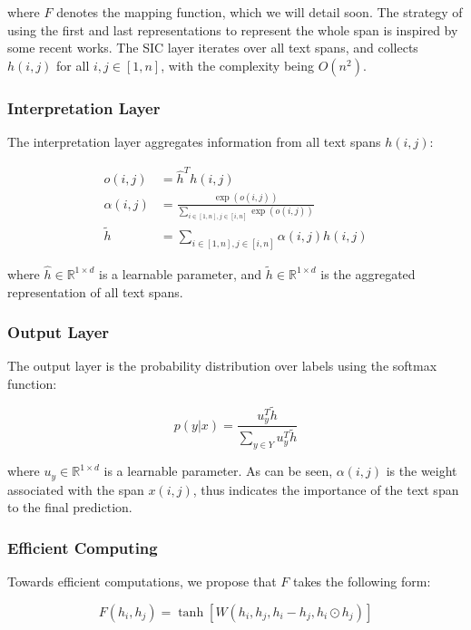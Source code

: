 where $F$ denotes the mapping function, which we will detail soon. 
The strategy of using the first and last representations to represent the whole
span is inspired by some recent works. The SIC layer iterates over all text
spans, and collects $h(i, j)$ for all $i, j \in [1, n]$, with the complexity
being $O(n^2)$.

\subsubsection{Interpretation Layer}

The interpretation layer aggregates information from all text spans $h(i, j)$:

\begin{align*}
    o(i, j) &= \hat{h}^T h(i, j)\\
    \alpha(i, j) &= \frac{\exp(o(i, j))}
    {\sum_{i \in [1, n], j \in [i, n]} \exp(o(i, j))}\\
    \tilde{h} &= \sum_{i \in [1, n], j \in [i, n]} \alpha(i, j)h(i, j)
\end{align*}

where $\hat{h} \in \mathbb{R}^{1 \times d}$ is a learnable parameter, and
$\tilde{h} \in \mathbb{R}^{1 \times d}$ is the aggregated representation of all
text spans.

\subsubsection{Output Layer}

The output layer is the probability distribution over labels using the softmax
function:

\begin{equation}
    p(y|x) = \frac{u_y^T \tilde{h}}{\sum_{y \in Y} u_y^T \tilde{h}}
\end{equation}

where $u_y \in \mathbb{R}^{1 \times d}$ is a learnable parameter.
As can be seen, $\alpha(i, j)$ is the weight associated with the span $x(i, j)$,
thus indicates the importance of the text span to the final prediction.

\subsubsection{Efficient Computing}

Towards efficient computations, we propose that $F$ takes the following form:

\begin{equation}
    F(h_i, h_j) = \tanh[W(h_i, h_j, h_i - h_j, h_i \odot h_j)]
\end{equation}

